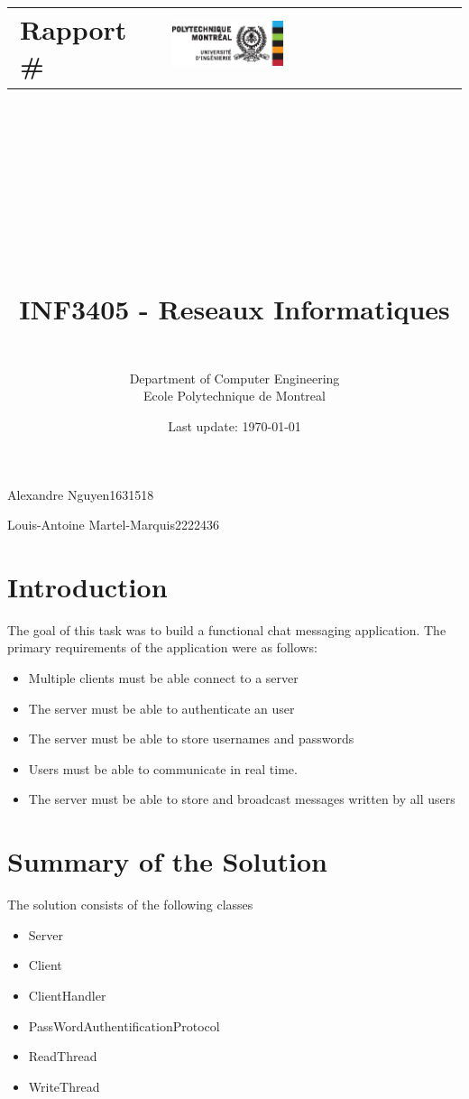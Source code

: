 \documentclass[11pt,letterpaper]{article}
\title{\vspace{-2.5cm} \noindent\makebox[\linewidth]{\color{rouge_poly}{\rule{\textwidth}{1.5pt}}}
		\begin{center}
		\begin{tabular}{m{6.5cm}m{6cm}}
		\textbf{ \huge Rapport \#\reportnumber}  & \includegraphics[width=0.4\textwidth]{logo_polytechnique.eps}
		\end{tabular}
		\end{center}
		\vspace{-0.25cm}
		\noindent\makebox[\linewidth]{\color{rouge_poly}{\rule{\textwidth}{1.5pt}}}
		\\ \  \\
		\Huge \firsttitle \\ \secondtitle  
		\\ \ \\
		\LARGE INF3405 -  Reseaux Informatiques
		}
\author{\session \\ Department of Computer Engineering \\ Ecole Polytechnique de Montreal}
\date{Last update: \today}
\newcommand{\firstauthor}{Alexandre Nguyen}
\newcommand{\firstregistrationnumber}{1631518}
\newcommand{\secondauthor}{Louis-Antoine Martel-Marquis}
\newcommand{\secondregistrationnumber}{2222436}
\begin{document}
\maketitle
\noindent\makebox[\linewidth]{\color{rouge_poly}{\rule{\textwidth}{1.5pt}}} 

\noindent \LARGE \firstauthor  \hfill \firstregistrationnumber

\noindent \LARGE \secondauthor \hfill \secondregistrationnumber

\noindent\makebox[\linewidth]{\color{rouge_poly}{\rule{\textwidth}{1.5pt}}}


\newpage
\normalsize

\section{Introduction}

The goal of this task was to build  a functional chat messaging application. The primary requirements of the application were as follows:
\begin{itemize}
  \item Multiple clients must be able connect to a server
  \item The server must be able to authenticate an user
  \item The server must be able to store usernames and passwords
  \item Users must be able to communicate in real time.
   \item The server must be able to store and broadcast messages written by all users
\end{itemize}

\section{Summary of the Solution}


The solution consists of the following classes
\begin{itemize}
  \item Server
  \item Client
  \item ClientHandler
   \item PassWordAuthentificationProtocol
   \item ReadThread
   \item WriteThread
\end{itemize}
\end{document}
